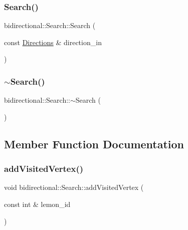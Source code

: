 \subsubsection{\texorpdfstring{Search()}{Search()}}
{\footnotesize\ttfamily bidirectional\+::\+Search\+::\+Search (\begin{DoxyParamCaption}\item[{const \hyperlink{namespacebidirectional_a4cbe6f0bfbd3629c2cd44c98014aed70}{Directions} \&}]{direction\+\_\+in }\end{DoxyParamCaption})}

\mbox{\label{classbidirectional_1_1Search_a4a361bd0416ed0208792b19fabc4e749}} 
\subsubsection{\texorpdfstring{$\sim$\+Search()}{~Search()}}
{\footnotesize\ttfamily bidirectional\+::\+Search\+::$\sim$\+Search (\begin{DoxyParamCaption}{ }\end{DoxyParamCaption})\hspace{0.3cm}{\ttfamily [inline]}}



\subsection{Member Function Documentation}
\mbox{\label{classbidirectional_1_1Search_a91b68db5c76c29195db8b2e4566fc601}} 
\subsubsection{\texorpdfstring{add\+Visited\+Vertex()}{addVisitedVertex()}}
{\footnotesize\ttfamily void bidirectional\+::\+Search\+::add\+Visited\+Vertex (\begin{DoxyParamCaption}\item[{const int \&}]{lemon\+\_\+id }\end{DoxyParamCaption})\hspace{0.3cm}{\ttfamily [inline]}}



